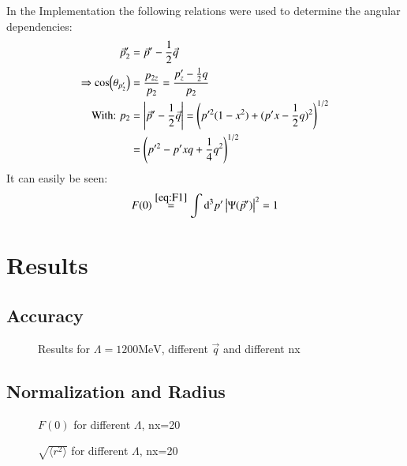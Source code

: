 \documentclass{scrartcl}
\begin{document}
In the Implementation the following relations were used to determine the angular dependencies:
\begin{align}
	\vec{p}_2'&=\vec{p}'-\dfrac{1}{2}\vec{q}\\
	\Rightarrow \cos(\theta_{p_2'})&=\dfrac{p_{2z}}{p_2}=\dfrac{p_{z}'-\frac{1}{2}q}{p_2}\\
	\text{With: } p_2&=\abs{\vec{p}'-\frac{1}{2}\vec{q}}=\left(p'^2(1-x^2)+(p'x-\dfrac{1}{2}q)^2\right)^{1/2}\\
	&=\left(p'^2-p'x q +\dfrac{1}{4}q^2\right)^{1/2}
\end{align}
It can easily be seen:
\begin{equation}
	F(0)\overset{\ref{eq:F1}}{=}\int \dd[3]{p'}\abs{\Psi(\vec{p}')}^2=1
\end{equation}
\section{Results}
\subsection{Accuracy}

\begin{figure}[htbp]
	
	\caption{Results for $\Lambda=1200\si{\mega\electronvolt}$, different $\vec{q}$ and different nx}
	\label{fig:accuracy}
\end{figure}

\subsection{Normalization and Radius}

\begin{figure}[htbp]
	
	\caption{$F(0)$ for different $\Lambda$, nx=20}
	\label{fig:fofzero}
\end{figure}

\begin{figure}[htbp]
	
	\caption{$\sqrt{\langle r^2\rangle}$ for different $\Lambda$, nx=20}
	\label{fig:radius}
\end{figure}

\newpage
\listoffigures
\listoftables
\printbibliography
\end{document}
